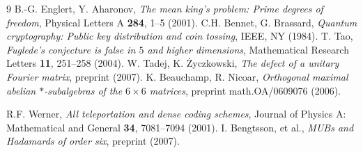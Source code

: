 \documentclass[a4paper,12pt,twoside]{article}
\begin{document}
\begin{thebibliography}{9}
 B.-G. Englert, Y. Aharonov, \emph{The mean king's problem: Prime degrees of freedom}, Physical Letters A {\bf 284}, 1--5 (2001).
 C.H. Bennet, G. Brassard, \emph{Quantum cryptography: Public key distribution and coin tossing}, IEEE, NY (1984).
 T. Tao, \emph{Fuglede's conjecture is false in $5$ and higher dimensions}, Mathematical Research Letters {\bf 11}, 251--258 (2004).
 W. Tadej, K. \.{Z}yczkowski, \emph{The defect of a unitary Fourier matrix}, preprint (2007).
 K. Beauchamp, R. Nicoar, \emph{Orthogonal maximal abelian $*$-subalgebras of the $6 \times 6$ matrices}, preprint math.OA/0609076 (2006).

 R.F. Werner, \emph{All teleportation and dense coding schemes}, Journal of Physics A: Mathematical and General {\bf 34}, 7081--7094 (2001).
 I. Bengtsson, et al., \emph{MUBs and Hadamards of order six}, preprint (2007).
\end{thebibliography}

\end{document}
